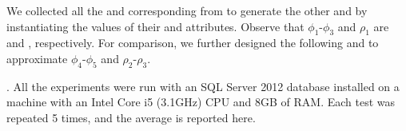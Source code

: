 We collected all the  and corresponding  from \dblp to generate the other \pCFDs and \pCINDs by instantiating the values of their  and  attributes. Observe that $\phi_1$-$\phi_3$ and $\rho _1$ are \CFDs and \CINDs, respectively. For comparison,  we further designed the following \CFDs and \CINDs to approximate $\phi_4$-$\phi_5$ and $\rho_2$-$\rho_3$.

\begin{footnotesize}
\end{footnotesize}


. All the experiments were run with an SQL Server 2012 database installed on a machine with an Intel Core i5 (3.1GHz) CPU and 8GB of RAM. Each test was repeated 5 times, and the average is reported here.

